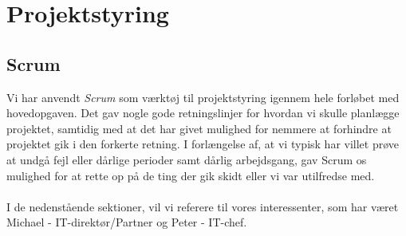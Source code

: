 \section{Projektstyring}
\subsection{Scrum}
Vi har anvendt \textit{Scrum} som værktøj til projektstyring igennem hele forløbet med hovedopgaven.
Det gav nogle gode retningslinjer for hvordan vi skulle planlægge projektet, samtidig med at det har givet mulighed for nemmere at forhindre at projektet gik i den forkerte retning.
I forlængelse af, at vi typisk har villet prøve at undgå fejl eller dårlige perioder samt dårlig arbejdsgang, gav Scrum os mulighed for
at rette op på de ting der gik skidt eller vi var utilfredse med.
\\\\
I de nedenstående sektioner, vil vi referere til vores interessenter, som har været Michael - IT-direktør/Partner og Peter - IT-chef.

